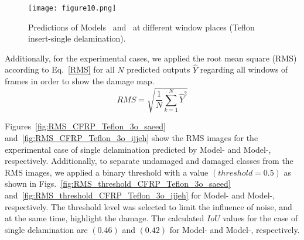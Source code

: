 \begin{figure}[!h]
	\centering
	\texttt{[image: figure10.png]}
	\caption{Predictions of Models~ and~ at different window places (Teflon insert-single delamination).}
	\label{fig:CFRP_Teflon_3o_predictions}
\end{figure}

Additionally, for the experimental cases, we applied the root mean square (RMS) according to Eq.~\ref{RMS} for all \(N\) predicted outputs \(\hat{Y}\) regarding all windows of frames in order to show the damage map.
\begin{equation}
	RMS = \sqrt{\frac{1}{N}\sum_{k=1}^{N}\hat{Y}^2}	
	\label{RMS}
\end{equation}

Figures~\ref{fig:RMS_CFRP_Teflon_3o_saeed} and~\ref{fig:RMS_CFRP_Teflon_3o_ijjeh} show the RMS images for the experimental case of single delamination predicted by Model- and Model-, respectively.
Additionally, to separate undamaged and damaged classes from the RMS images, we applied a binary threshold with a value \((threshold=0.5)\) as shown in Figs.~\ref{fig:RMS_threshold_CFRP_Teflon_3o_saeed} and~\ref{fig:RMS_threshold_CFRP_Teflon_3o_ijjeh} for Model- and Model-, respectively. 
The threshold level was selected to limit the influence of noise, and at the same time, highlight the damage.
The calculated \(IoU\) values for the case of single delamination are \((0.46)\) and \((0.42)\) for Model- and Model-, respectively.

